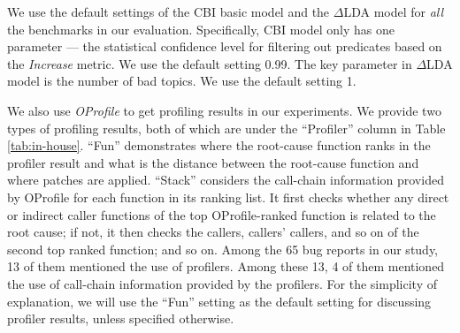 We use the default settings of the CBI basic model and the 
$\Delta$LDA model for \textit{all} the benchmarks in our evaluation.
Specifically, CBI model only has one parameter --- the statistical
confidence level for filtering out predicates based on the \textit{Increase}
metric. We use the default setting 0.99. The key parameter
in $\Delta$LDA model is the number of bad topics. We use the default setting
1.

We also use \textit{OProfile} \citep{oprofile} to get profiling results in our 
experiments.
We provide two types of profiling results, both of which are under the
``Profiler'' column in Table \ref{tab:in-house}.
``Fun'' demonstrates where the root-cause function ranks in the profiler 
result and what is the distance between 
the root-cause function and where patches are applied. 
``Stack'' considers the call-chain information provided by OProfile for each function
in its ranking list. It first checks whether any direct or indirect caller functions
of the top OProfile-ranked function is related to the root
cause; if not, it then checks the callers, callers' callers, and so on
of the second top ranked function;
and so on.
Among the 65 bug reports in our study, 13 of them mentioned the use of 
profilers. Among these 13, 4 of them mentioned the use of call-chain information
provided by the profilers.
For the simplicity of explanation, we will use the ``Fun'' setting as the
default setting for discussing profiler results,
unless specified otherwise.


